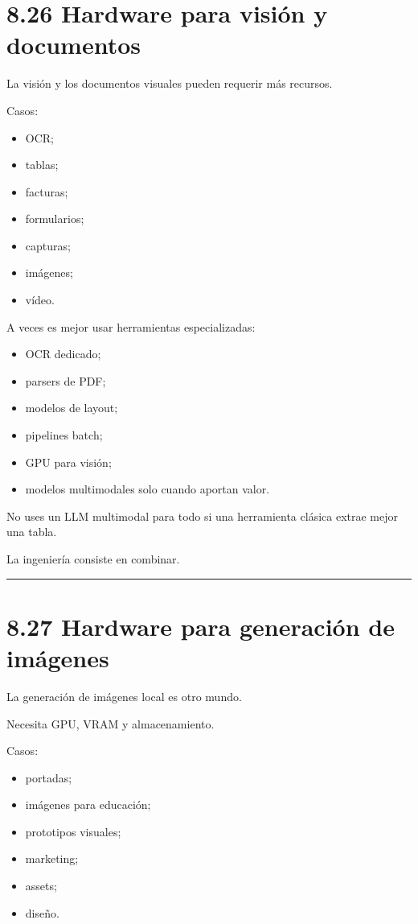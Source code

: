 \section{8.26 Hardware para visión y
documentos}\label{hardware-para-visiuxf3n-y-documentos}

La visión y los documentos visuales pueden requerir más recursos.

Casos:

\begin{itemize}
\tightlist
\item
  OCR;
\item
  tablas;
\item
  facturas;
\item
  formularios;
\item
  capturas;
\item
  imágenes;
\item
  vídeo.
\end{itemize}

A veces es mejor usar herramientas especializadas:

\begin{itemize}
\tightlist
\item
  OCR dedicado;
\item
  parsers de PDF;
\item
  modelos de layout;
\item
  pipelines batch;
\item
  GPU para visión;
\item
  modelos multimodales solo cuando aportan valor.
\end{itemize}

No uses un LLM multimodal para todo si una herramienta clásica extrae
mejor una tabla.

La ingeniería consiste en combinar.

\begin{center}\rule{0.5\linewidth}{0.5pt}\end{center}

\section{8.27 Hardware para generación de
imágenes}\label{hardware-para-generaciuxf3n-de-imuxe1genes}

La generación de imágenes local es otro mundo.

Necesita GPU, VRAM y almacenamiento.

Casos:

\begin{itemize}
\tightlist
\item
  portadas;
\item
  imágenes para educación;
\item
  prototipos visuales;
\item
  marketing;
\item
  assets;
\item
  diseño.
\end{itemize}


